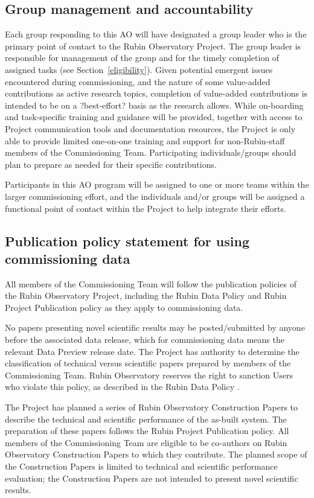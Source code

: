 \documentclass[SE,authoryear,toc]{lsstdoc}
\begin{document}
\subsection{Group management and accountability}

Each group responding to this AO will have designated a group leader who is the primary point of contact to the Rubin Observatory Project. The group leader is responsible for management of the group and for the timely completion of assigned tasks (see Section~\ref{eligibility}). Given potential emergent issues encountered during commissioning, and the nature of some value-added contributions as active research topics, completion of value-added contributions is intended to be on a ?best-effort? basis as the research allows. While on-boarding and task-specific training and guidance will be provided, together with access to Project communication tools and documentation resources, the Project is only able to provide limited one-on-one training and support for non-Rubin-staff members of the Commissioning Team. Participating individuals/groups should plan to prepare as needed for their specific contributions.

Participants in this AO program will be assigned to one or more teams within the larger commissioning effort, and the individuals and/or groups will be assigned a functional point of contact within the Project to help integrate their efforts.

\subsection{Publication policy statement for using commissioning data}
\label{publications}

All members of the Commissioning Team will follow the publication policies of the Rubin Observatory Project, including the Rubin Data Policy  and Rubin Project Publication policy  as they apply to commissioning data.

No papers presenting novel scientific results may be posted/submitted by anyone before the associated data release, which for commissioning data means the relevant Data Preview release date. The Project has authority to determine the classification of technical versus scientific papers prepared by members of the Commissioning Team. Rubin Observatory reserves the right to sanction Users who violate this policy, as described in the Rubin Data Policy . 

The Project has planned a series of Rubin Observatory Construction Papers to describe the technical and scientific performance of the as-built system. The preparation of these papers follows the Rubin Project Publication policy. All members of the Commissioning Team are eligible to be co-authors on Rubin Observatory Construction Papers to which they contribute. The planned scope of the Construction Papers is limited to technical and scientific performance evaluation; the Construction Papers are not intended to present novel scientific results.
\end{document}
